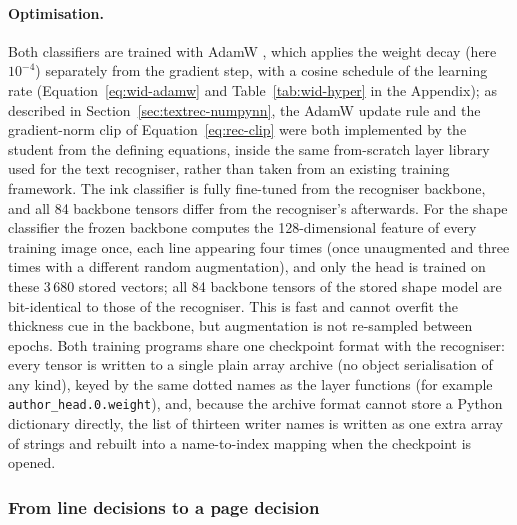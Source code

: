 \paragraph{Optimisation.}
Both classifiers are trained with AdamW \cite{kingma2015,loshchilov2019}, which applies the weight decay (here $10^{-4}$) separately from the gradient step, with a cosine schedule of the learning rate (Equation~\ref{eq:wid-adamw} and Table~\ref{tab:wid-hyper} in the Appendix); as described in Section~\ref{sec:textrec-numpynn}, the AdamW update rule and the gradient-norm clip of Equation~\ref{eq:rec-clip} were both implemented by the student from the defining equations, inside the same from-scratch layer library used for the text recogniser, rather than taken from an existing training framework.
The ink classifier is fully fine-tuned from the recogniser backbone, and all 84 backbone tensors differ from the recogniser's afterwards.
For the shape classifier the frozen backbone computes the 128-dimensional feature of every training image once, each line appearing four times (once unaugmented and three times with a different random augmentation), and only the head is trained on these 3\,680 stored vectors; all 84 backbone tensors of the stored shape model are bit-identical to those of the recogniser.
This is fast and cannot overfit the thickness cue in the backbone, but augmentation is not re-sampled between epochs.
Both training programs share one checkpoint format with the recogniser: every tensor is written to a single plain array archive (no object serialisation of any kind), keyed by the same dotted names as the layer functions (for example \texttt{author\_head.0.weight}), and, because the archive format cannot store a Python dictionary directly, the list of thirteen writer names is written as one extra array of strings and rebuilt into a name-to-index mapping when the checkpoint is opened.

\subsubsection{From line decisions to a page decision}

